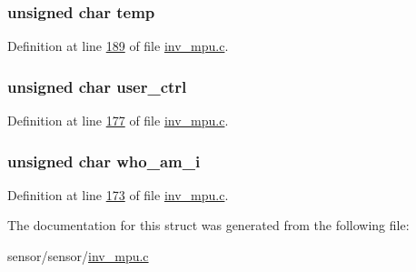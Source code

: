 \subsubsection[{\texorpdfstring{temp}{temp}}]{\setlength{\rightskip}{0pt plus 5cm}unsigned char temp}\hypertarget{structgyro__reg__s_abe413cb96d839cbe31417aa52d920f21}{}\label{structgyro__reg__s_abe413cb96d839cbe31417aa52d920f21}


Definition at line \hyperlink{inv__mpu_8c_source_l00189}{189} of file \hyperlink{inv__mpu_8c_source}{inv\+\_\+mpu.\+c}.

\subsubsection[{\texorpdfstring{user\+\_\+ctrl}{user_ctrl}}]{\setlength{\rightskip}{0pt plus 5cm}unsigned char user\+\_\+ctrl}\hypertarget{structgyro__reg__s_ad8384710853dc1f9580b9ff19e87efbc}{}\label{structgyro__reg__s_ad8384710853dc1f9580b9ff19e87efbc}


Definition at line \hyperlink{inv__mpu_8c_source_l00177}{177} of file \hyperlink{inv__mpu_8c_source}{inv\+\_\+mpu.\+c}.

\subsubsection[{\texorpdfstring{who\+\_\+am\+\_\+i}{who_am_i}}]{\setlength{\rightskip}{0pt plus 5cm}unsigned char who\+\_\+am\+\_\+i}\hypertarget{structgyro__reg__s_aa52d78bb2b62fee23a0b759e545dba4b}{}\label{structgyro__reg__s_aa52d78bb2b62fee23a0b759e545dba4b}


Definition at line \hyperlink{inv__mpu_8c_source_l00173}{173} of file \hyperlink{inv__mpu_8c_source}{inv\+\_\+mpu.\+c}.



The documentation for this struct was generated from the following file\+:\begin{DoxyCompactItemize}
\item 
sensor/sensor/\hyperlink{inv__mpu_8c}{inv\+\_\+mpu.\+c}\end{DoxyCompactItemize}
